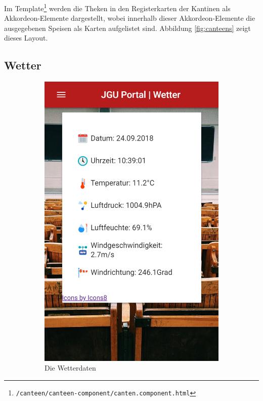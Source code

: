 Im Template\footnote{\texttt{/canteen/canteen-component/canten.component.html}} werden die Theken in den Registerkarten der Kantinen als Akkordeon-Elemente dargestellt, wobei innerhalb dieser Akkordeon-Elemente die ausgegebenen Speisen als Karten aufgelistet sind. Abbildung \ref{fig:canteens} zeigt dieses Layout.

\subsection{Wetter}
\label{sec:prog:weather}
\begin{figure}
\begin{subfigure}{.5\textwidth}
  \centering
  \includegraphics[width=.8\linewidth]{gfx/Wetter}
  \caption{Die Wetterdaten}
  \label{fig:Weather}
\end{subfigure}%
\begin{subfigure}{.5\textwidth}
  \centering

\end{subfigure}
\end{figure}
